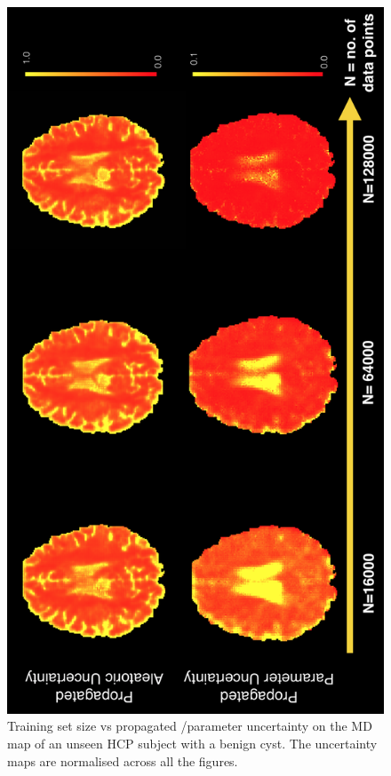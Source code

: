 \begin{figure}[ht] 
	\centering
	\includegraphics[width=\linewidth]{chapter_3/figures/fig_8_5.png}
	\small
	\caption{\footnotesize Training set size vs propagated /parameter uncertainty on the MD map of an unseen HCP subject with a benign cyst. The uncertainty maps are normalised across all the figures. } 
	\label{fig:uncertainty_decomp_1}
\end{figure}

